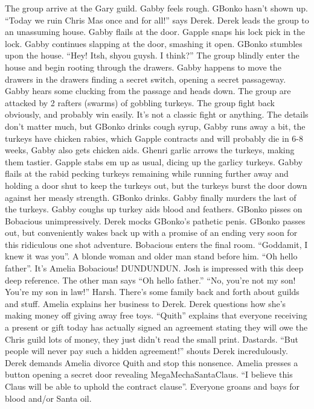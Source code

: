 The group arrive at the Gary guild. Gabby feels rough. GBonko hasn’t shown up.\medskip
“Today we ruin Chris Mas once and for all!” says Derek. Derek leads the group to an unassuming house. Gabby flails at the door. Gapple snaps his lock pick in the lock. Gabby continues slapping at the door, smashing it open. GBonko stumbles upon the house. “Hey! Itsh, shyou guysh. I think?”\medskip
The group blindly enter the house and begin rooting through the drawers. Gabby happens to move the drawers in the drawers finding a secret switch, opening a secret passageway.\medskip
Gabby hears some clucking from the passage and heads down. The group are attacked by 2 rafters (swarms) of gobbling turkeys. The group fight back obviously, and probably win easily. It’s not a classic fight or anything. The details don’t matter much, but GBonko drinks cough syrup, Gabby runs away a bit, the turkeys have chicken rabies, which Gapple contracts and will probably die in 6-8 weeks, Gabby also gets chicken aids. Ghenri garlic arrows the turkeys, making them tastier. Gapple stabs em up as usual, dicing up the garlicy turkeys. Gabby flails at the rabid pecking turkeys remaining while running further away and holding a door shut to keep the turkeys out, but the turkeys burst the door down against her measly strength. GBonko drinks. Gabby finally murders the last of the turkeys.\medskip
Gabby coughs up turkey aids blood and feathers. GBonko pisses on Bobacious unimpressively. Derek mocks GBonko’s pathetic penis. GBonko passes out, but conveniently wakes back up with a promise of an ending very soon for this ridiculous one shot adventure.\medskip
Bobacious enters the final room. “Goddamit, I knew it was you”. A blonde woman and older man stand before him. “Oh hello father”. It’s Amelia Bobacious! DUNDUNDUN. Josh is impressed with this deep deep reference. The other man says “Oh hello father.” “No, you’re not my son! You’re my son in law!” Harsh.\medskip
There’s some family back and forth about guilds and stuff. Amelia explains her business to Derek. Derek questions how she’s making money off giving away free toys. “Quith” explains that everyone receiving a present or gift today has actually signed an agreement stating they will owe the Chris guild lots of money, they just didn’t read the small print. Dastards. “But people will never pay such a hidden agreement!” shouts Derek incredulously.\medskip
Derek demands Amelia divorce Quith and stop this nonsence. Amelia presses a button opening a secret door revealing MegaMechaSantaClaus. “I believe this Claus will be able to uphold the contract clause”. Everyone groans and bays for blood and/or Santa oil.\medskip
